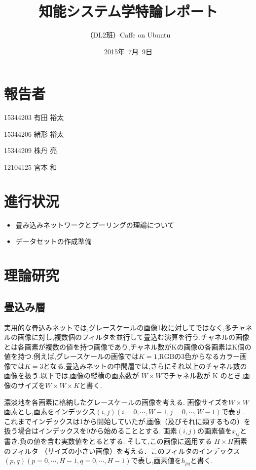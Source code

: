\documentclass[a4paper,10pt]{jsarticle}
\title{知能システム学特論レポート}
\author{
（DL2班）Caffe on Ubuntu\\
}
\date{2015年\ 7月\ 9日}
\begin{document}
\maketitle
\section{報告者}
\begin{list}{}{}
 \item 15344203\hspace{0.5cm} 有田 裕太
 \item 15344206\hspace{0.5cm} 緒形 裕太
 \item 15344209\hspace{0.5cm} 株丹 亮
 \item 12104125\hspace{0.5cm} 宮本 和
\end{list}

\section{進行状況}

\begin{itemize}
\item 畳み込みネットワークとプーリングの理論について
\item データセットの作成準備
\end{itemize}

\section{理論研究}

\subsection{畳込み層}

実用的な畳込みネットでは,グレースケールの画像1枚に対してではなく,多チャネルの画像に対し,複数個のフィルタを並行して畳込む演算を行う.チャネルの画像とは各画素が複数の値を持つ画像であり,チャネル数がKの画像の各画素はK個の値を持つ.例えば,グレースケールの画像では$K = 1$,RGBの3色からなるカラー画像では$K = 3$となる.畳込みネットの中間層では,さらにそれ以上のチャネル数の画像を扱う.以下では,画像の縦横の画素数が $W \times W$でチャネル数が K のとき,画像のサイズを$W \times W \times K$と書く.

濃淡地を各画素に格納したグレースケールの画像を考える.
画像サイズを$W\times W$画素とし,画素をインデックス$(i,j)(i = 0,\cdots,W-1, j = 0,\cdots,W-1)$で表す.
これまでインデックスは1から開始していたが,画像（及びそれに類するもの）を扱う場合はインデックスを0から始めることとする.
画素$(i,j)$の画素値を$x_{ij}$と書き,負の値を含む実数値をとるとする.
そして,この画像に適用する $H\times H$画素のフィルタ
（サイズの小さい画像）を考える．このフィルタのインデックス$(p,q)(p=0,\cdots,H-1, q=0,\cdots,H-1)$で表し,画素値を$h_{pq}$と書く.
\end{document}
